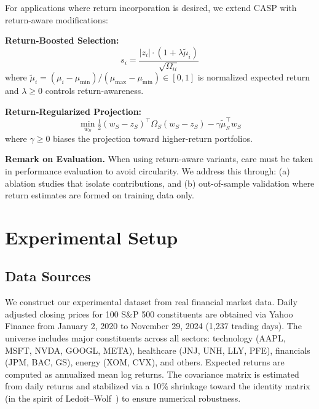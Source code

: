 \documentclass[10pt,twocolumn,a4paper]{article}
\begin{document}
For applications where return incorporation is desired, we extend CASP with return-aware modifications:

\textbf{Return-Boosted Selection:}
\begin{equation}
s_i = \frac{|z_i| \cdot (1 + \lambda \tilde{\mu}_i)}{\sqrt{\Omega_{ii}}}
\label{eq:score_return}
\end{equation}
where $\tilde{\mu}_i = (\mu_i - \mu_{\min}) / (\mu_{\max} - \mu_{\min}) \in [0,1]$ is normalized expected return and $\lambda \geq 0$ controls return-awareness.

\textbf{Return-Regularized Projection:}
\begin{equation}
\min_{w_S} \tfrac{1}{2}(w_S - z_S)^\top \Omega_S (w_S - z_S) - \gamma \tilde{\mu}_S^\top w_S
\label{eq:proj_return}
\end{equation}
where $\gamma \geq 0$ biases the projection toward higher-return portfolios.

\textbf{Remark on Evaluation.} When using return-aware variants, care must be taken in performance evaluation to avoid circularity. We address this through: (a) ablation studies that isolate contributions, and (b) out-of-sample validation where return estimates are formed on training data only.

\section{Experimental Setup}
\label{sec:setup}

\subsection{Data Sources}

We construct our experimental dataset from real financial market data. Daily adjusted closing prices for 100 S\&P 500 constituents are obtained via Yahoo Finance from January 2, 2020 to November 29, 2024 (1,237 trading days). The universe includes major constituents across all sectors: technology (AAPL, MSFT, NVDA, GOOGL, META), healthcare (JNJ, UNH, LLY, PFE), financials (JPM, BAC, GS), energy (XOM, CVX), and others. Expected returns are computed as annualized mean log returns. The covariance matrix is estimated from daily returns and stabilized via a 10\% shrinkage toward the identity matrix (in the spirit of Ledoit--Wolf~\cite{ledoit2004honey}) to ensure numerical robustness.
\end{document}
